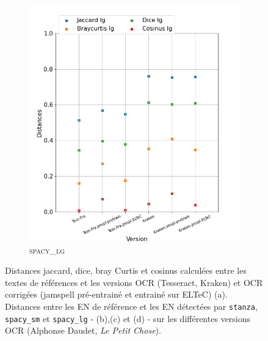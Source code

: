 \begin{figure}[H]
\begin{minipage}{6cm}
\begin{subfigure}{0.89\textwidth}
  \includegraphics[width=.89\textwidth]{IMAGES/ELTeC_DISTANCES_spaCy3.5.1/DAUDET-graph-dist-spaCy3.5.1-lg.png}
   \caption{\textsc{spacy\_lg}}
  \label{fig: }
  \end{subfigure}
  \end{minipage}
\caption{Distances jaccard, dice, bray Curtis et cosinus calculées entre les textes de références et les versions OCR (Tesseract, Kraken) et OCR corrigées (jamspell pré-entrainé et entrainé sur ELTeC) (a). Distances entre les EN de référence et les EN détectées par \texttt{stanza}, \texttt{spacy\_sm} et \texttt{spacy\_lg} - (b),(c) et (d) - sur les différentes versions OCR (Alphonse Daudet, \textit{Le Petit Chose}).}
\label{fig:}
\end{figure}


